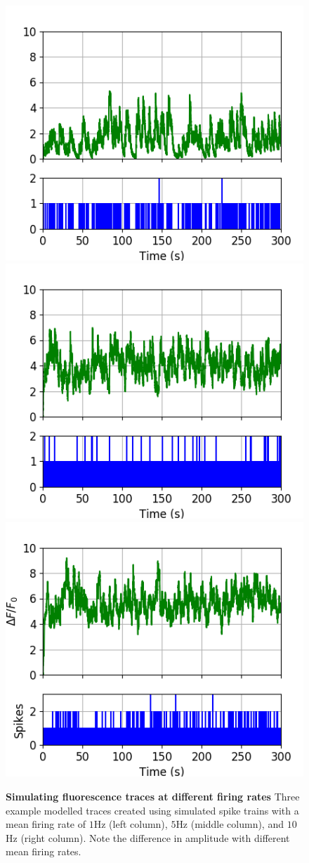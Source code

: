 \documentclass[a4paper,12pt]{article}
\theoremstyle{definition}
\begin{document}
\begin{figure}[h]
  \includegraphics[width=0.329\linewidth]{figures/freq_compare_images_1_Hz_3_9.png}
  \includegraphics[width=0.329\linewidth]{figures/freq_compare_images_5_Hz_3_8.png}
  \includegraphics[width=0.329\linewidth]{figures/freq_compare_images_10_Hz_3_7.png}
  \caption{\textbf{Simulating fluorescence traces at different firing rates } Three example modelled traces created using simulated spike trains with a mean firing rate of $1$Hz (left column), $5$Hz (middle column), and $10$Hz (right column). Note the difference in amplitude with different mean firing rates.}
  \label{fig:frequency_comparison_traces}
\end{figure}
\end{document}
